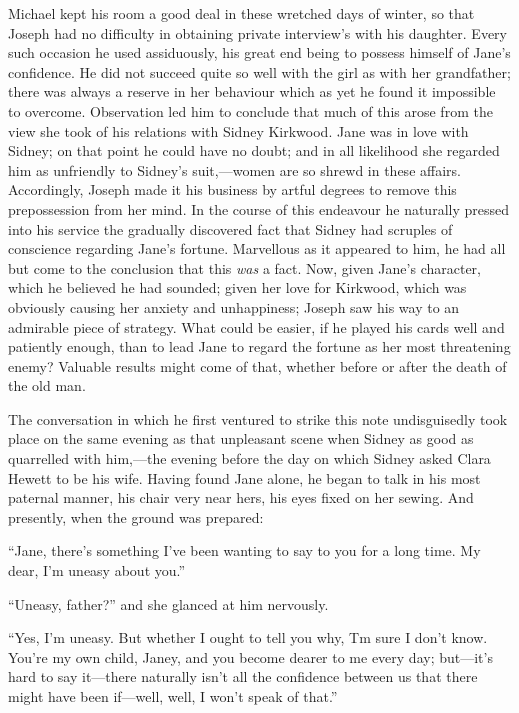 Michael kept his room a good deal in these wretched days of winter, so
that Joseph had no difficulty in obtaining private interview's with his
daughter. Every such occasion he {}used assiduously, his great end being
to possess himself of Jane's confidence. He did not succeed quite so
well with the girl as with her grandfather; there was always a reserve
in her behaviour which as yet he found it impossible to overcome.
Observation led him to conclude that much of this arose from the view
she took of his relations with Sidney Kirkwood. Jane was in love with
Sidney; on that point he could have no doubt; and in all likelihood she
regarded him as unfriendly to Sidney's suit,---women are so shrewd in
these affairs. Accordingly, Joseph made it his business by artful
degrees to remove this prepossession from her mind. In the course of
this endeavour he naturally pressed into his service the gradually
discovered fact that Sidney had scruples of conscience regarding Jane's
fortune. Marvellous as it appeared to him, he had all but come to the
conclusion that this \emph{was} a fact. Now, given Jane's character,
which he believed he had sounded; given her love for Kirkwood, which was
obviously causing her anxiety and unhappiness; Joseph saw his way to an
admirable piece of strategy. What could be easier, if he played his
cards well and patiently enough, {}than to lead Jane to regard the
fortune as her most threatening enemy? Valuable results might come of
that, whether before or after the death of the old man.

The conversation in which he first ventured to strike this note
undisguisedly took place on the same evening as that unpleasant scene
when Sidney as good as quarrelled with him,---the evening before the day
on which Sidney asked Clara Hewett to be his wife. Having found Jane
alone, he began to talk in his most paternal manner, his chair very near
hers, his eyes fixed on her sewing. And presently, when the ground was
prepared:

``Jane, there's something I've been wanting to say to you for a long
time. My dear, I'm uneasy about you.''

``Uneasy, father?'' and she glanced at him nervously.

``Yes, I'm uneasy. But whether I ought to tell you why, Tm sure I don't
know. You're my own child, Janey, and you become dearer to me every day;
but---it's hard to say it---there naturally isn't all the confidence
between us that there might have been if---well, well, I won't speak of
that.''

